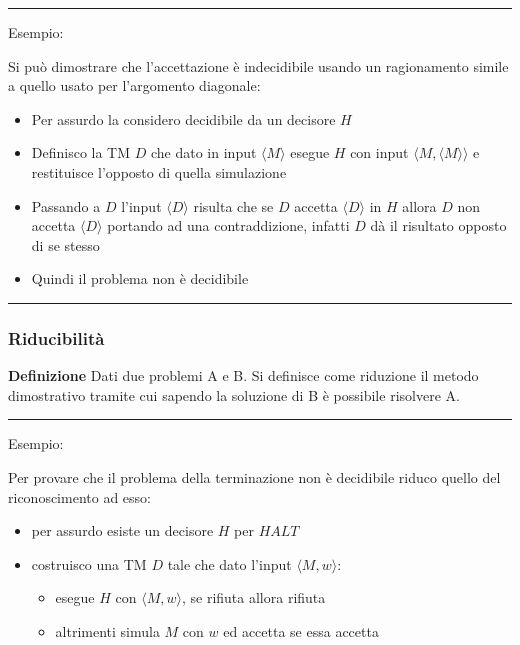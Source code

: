 \documentclass{article}
\begin{document}
\newpage

\noindent\rule{\textwidth}{0.5pt}\newline

\noindent Esempio:\newline

\noindent Si può dimostrare che l'accettazione è indecidibile usando un ragionamento simile a quello usato per l'argomento diagonale:
\begin{itemize}
    \item Per assurdo la considero decidibile da un decisore $H$
    \item Definisco la TM $D$ che dato in input $\langle M\rangle$ esegue $H$ con input $\langle M,\langle M\rangle\rangle$ e restituisce l'opposto di quella simulazione
    \item Passando a $D$ l'input $\langle D\rangle$ risulta che se $D$ accetta $\langle D\rangle$ in $H$ allora $D$ non accetta $\langle D\rangle$ portando ad una contraddizione, infatti $D$ dà il risultato opposto di se stesso
    \item Quindi il problema non è decidibile
\end{itemize}


\noindent\rule{\textwidth}{0.5pt}

\subsubsection{Riducibilità}

\textbf{Definizione} Dati due problemi A e B. Si definisce come riduzione il metodo dimostrativo tramite
cui sapendo la soluzione di B è possibile risolvere A.\newline

\noindent\rule{\textwidth}{0.5pt}\newline

\noindent Esempio:\newline

\noindent Per provare che il problema della terminazione non è decidibile riduco quello del riconoscimento ad esso:\newline
\begin{itemize}
    \item per assurdo esiste un decisore $H$ per $HALT$
    \item costruisco una TM $D$ tale che dato l'input $\langle M,w\rangle$:
    \begin{itemize}
        \item esegue $H$ con $\langle M,w\rangle$, se rifiuta allora rifiuta
        \item altrimenti simula $M$ con $w$ ed accetta se essa accetta
    \end{itemize}
\end{itemize}
\end{document}
